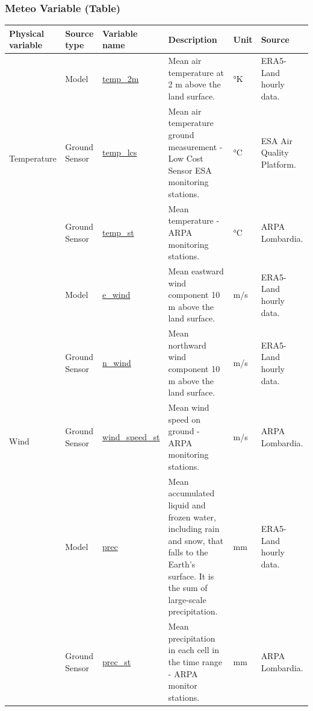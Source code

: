 \subsubsection{Meteo Variable (Table)}
\begin{center}
\setlength{\arrayrulewidth}{1.5pt}

\begin{longtable}{ |p{2.3cm}|p{1.8cm}|p{2.3cm}|p{4cm}|p{1cm}|p{2.3cm}| } 
\hline
\textbf{Physical variable} & \textbf{Source type}  & \textbf{Variable name}  & \textbf{Description}  & \textbf{Unit}  & \textbf{Source}\\ 
\hline
\multirow{3}{4em}{Temperature} & Model  & \underline{temp\_2m} & Mean air temperature at 2 m above the land surface.\par & °K & ERA5-Land hourly data.\\ 
& Ground \newline Sensor  & \underline{temp\_lcs} &  Mean air temperature ground measurement - Low Cost Sensor ESA monitoring stations.\par & °C & ESA Air Quality Platform.\\ 
& Ground \newline Sensor  & \underline{temp\_st} &  Mean temperature - ARPA monitoring stations.\par & °C & ARPA \newline Lombardia.\\ \hline

\multirow{4}{4em}{Wind} & Model  & \underline{e\_wind} & Mean eastward wind component 10 m above the land surface.\par & m/s & ERA5-Land hourly data.\\ 
& Ground \newline Sensor  & \underline{n\_wind} &  Mean northward wind component 10 m above the land surface.\par & m/s & ERA5-Land hourly data.\\
& Ground \newline Sensor  & \underline{wind\_speed\_st} &  Mean wind speed on ground  - ARPA monitoring stations. \par& m/s& ARPA \newline Lombardia.\\ \hline
\pagebreak
\hline
\multirow{2}{4em}{Precipitation} & Model  & \underline{prec} & Mean accumulated liquid and frozen water, including rain and snow, that falls to the Earth's surface. It is the sum of large-scale precipitation. \par & mm & ERA5-Land hourly data.\\ 
& Ground \newline Sensor  & \underline{prec\_st} &  Mean precipitation in each cell in the time range - ARPA monitor stations. \par & mm & ARPA \newline Lombardia.\\ \hline


\end{longtable}
\end{center}
